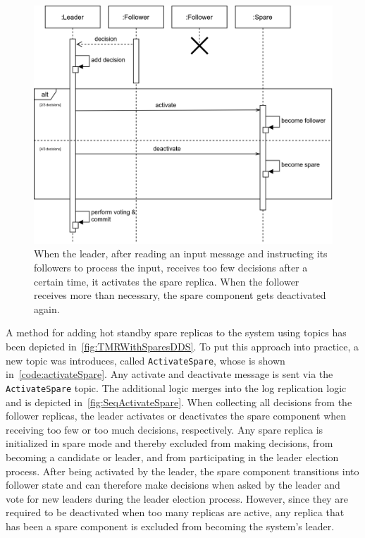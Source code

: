 \begin{figure}[!hb]
	\centering
	\includegraphics[width=0.75\linewidth]{images/sequence/ActivateSpare}
	\caption{When the leader, after reading an input message and instructing its followers to process the input, receives too few decisions after a certain time, it activates the spare replica. When the follower receives more than necessary, the spare component gets deactivated again.}
	\label{fig:SeqActivateSpare}
\end{figure}

A method for adding hot standby spare replicas to the system using  topics has been depicted in~\autoref{fig:TMRWithSparesDDS}.
To put this approach into practice, a new topic was introduces, called \texttt{ActivateSpare}, whose  is shown in~\autoref{code:activateSpare}.
Any activate and deactivate message is sent via the \texttt{ActivateSpare} topic.
The additional logic merges into the log replication logic and is depicted in~\autoref{fig:SeqActivateSpare}.
When collecting all decisions from the follower replicas, the leader activates or deactivates the spare component when receiving too few or too much decisions, respectively.
Any spare replica is initialized in spare mode and thereby excluded from making decisions, from becoming a candidate or leader, and from participating in the leader election process.
After being activated by the leader, the spare component transitions into follower state and can therefore make decisions when asked by the leader and vote for new leaders during the leader election process.
However, since they are required to be deactivated when too many replicas are active, any replica that has been a spare component is excluded from becoming the system's leader.


